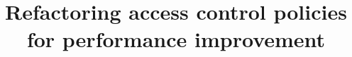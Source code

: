 \documentclass{acm_proc_article-sp}
\begin{document}
\title{Refactoring access control policies for performance improvement}

\pagestyle{plain} %
\setcounter{page}{1}
%
%
%
%
%

%

\end{document}
